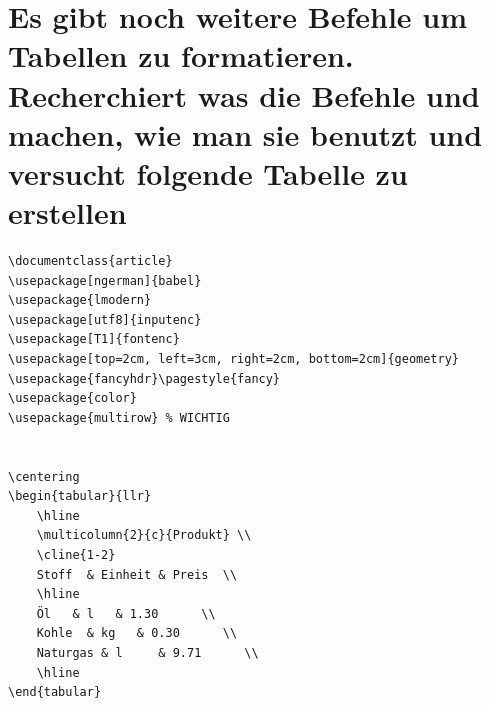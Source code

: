 \section{Es gibt noch weitere Befehle um Tabellen zu formatieren. \\
Recherchiert was die Befehle  und  machen, wie man sie benutzt und versucht folgende Tabelle zu erstellen\\} 
\vspace{-10pt}

\begin{Antwort}
\begin{lstlisting}[style=latex]
\documentclass{article}
\usepackage[ngerman]{babel}
\usepackage{lmodern}
\usepackage[utf8]{inputenc}
\usepackage[T1]{fontenc}
\usepackage[top=2cm, left=3cm, right=2cm, bottom=2cm]{geometry}
\usepackage{fancyhdr}\pagestyle{fancy}
\usepackage{color}
\usepackage{multirow} % WICHTIG


\centering
\begin{tabular}{llr}
	\hline
	\multicolumn{2}{c}{Produkt} \\
	\cline{1-2}
	Stoff  & Einheit & Preis  \\
	\hline
	Öl   & l   & 1.30      \\
	Kohle  & kg   & 0.30      \\
	Naturgas & l     & 9.71      \\
	\hline
\end{tabular}


\end{lstlisting}

\end{Antwort}


\newpage
